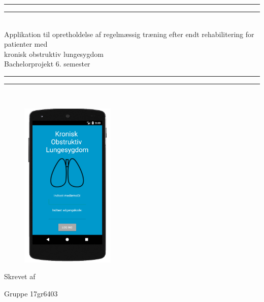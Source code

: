 \begin{center}
\vspace*{\baselineskip}
\rule{\textwidth}{1.6pt}\vspace*{-\baselineskip}\vspace*{2pt} %
\rule{\textwidth}{0.4pt}\\[\baselineskip] %

{\huge Applikation til opretholdelse af regelmæssig træning efter endt rehabilitering for patienter med\\ kronisk obstruktiv lungesygdom\\[0.4\baselineskip] \LARGE Bachelorprojekt 6. semester}\\[0.2\baselineskip] %

\rule{\textwidth}{0.4pt}\vspace*{-\baselineskip}\vspace{3.2pt} %
\rule{\textwidth}{1.6pt}\\[\baselineskip] %
\vspace*{1\baselineskip}




\begin{figure} [H]
\centering
\includegraphics[width=0.4\textwidth]{figures/test/KOLKOLforside}
\label{fig:aktivitetsdiagram}
\end{figure}
Skrevet af \\
{\Large Gruppe 17gr6403\par}
\end{center} %


